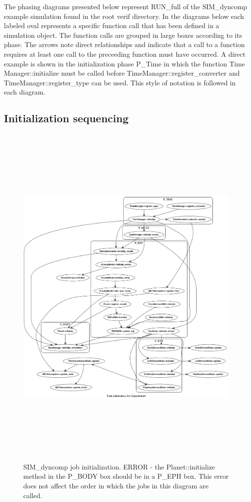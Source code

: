 The phasing diagrams presented below represent RUN\_full of the SIM\_dyncomp example simulation found in the root verif directory. In the diagrams below each labeled oval represents a specific function call that has been defined in a simulation object.  The function calls are grouped in large boxes according to its phase. The arrows note direct relationships and indicate that a call to a function requires at least one call to the preceeding function must have occurred. A direct example is shown in the initialization phase P\_Time in which the function Time Manager::initialize must be called before TimeManager::register\_converter and TimeManager::register\_type can be used. This style of notation is followed in each diagram.

\clearpage
\newpage
\subsection{Initialization sequencing}
\begin{figure}[h!]
\includegraphics [height=7in]{figs/phasing/initialization.png}
\caption{SIM\_dyncomp job initialization. ERROR - the Planet::initialize method
in the P\_BODY box should be in a P\_EPH box.  This error does not affect the
order in which the jobs in this diagram are called.}
\label{fig:init}
\end{figure}

